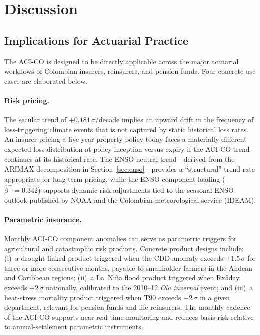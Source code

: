 \documentclass[12pt]{article}
\begin{document}
\section{Discussion}\label{sec:discussion}
 
\subsection{Implications for Actuarial Practice}
 
The ACI-CO is designed to be directly applicable across the major actuarial
workflows of Colombian insurers, reinsurers, and pension funds.
Four concrete use cases are elaborated below.

\paragraph{Risk pricing.} The secular trend of $+0.181\,\sigma$/decade implies an upward drift in the frequency of loss-triggering climate events that is not captured by static historical loss rates. An insurer pricing a five-year property policy today faces a materially different expected loss distribution at policy inception versus expiry if the ACI-CO trend continues at its historical rate. The ENSO-neutral trend---derived from the ARIMAX decomposition in Section~\ref{sec:enso}---provides a ``structural'' trend rate appropriate for long-term pricing, while the ENSO component loading ($\hat{\beta}^+ = 0.342$) supports dynamic risk adjustments tied to the seasonal ENSO outlook published by NOAA and the Colombian meteorological service (IDEAM).

\paragraph{Parametric insurance.} Monthly ACI-CO component anomalies can serve as parametric triggers for agricultural and catastrophic risk products. Concrete product designs include: (i)~a drought-linked product triggered when the CDD anomaly exceeds $+1.5\,\sigma$ for three or more consecutive months, payable to smallholder farmers in the Andean and Caribbean regions; (ii)~a La~Ni\~na flood product triggered when Rx5day exceeds $+2\,\sigma$ nationally, calibrated to the 2010--12 \emph{Ola invernal} event; and (iii)~a heat-stress mortality product triggered when T90 exceeds $+2\,\sigma$ in a given department, relevant for pension funds and life reinsurers. The monthly cadence of the ACI-CO supports near real-time monitoring and reduces basis risk relative to annual-settlement parametric instruments.
\end{document}
